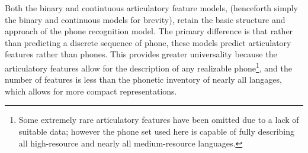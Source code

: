 Both the binary and contintuous articulatory feature models, (henceforth
simply the binary and continuous models for brevity), retain the basic 
structure and approach of the phone recognition model. The primary difference
is that rather than predicting a discrete sequence of phone, these models 
predict articulatory features rather than phones. This provides greater 
universality because the articulatory features allow for the description
of any realizable phone\footnote{Some extremely rare articulatory features 
have been omitted due to a lack of suitable data; however the phone set used here is capable 
of fully describing all high-resource and nearly all medium-resource languages.}, 
and the number of features is less than the phonetic inventory of nearly 
all langages, which allows for more compact representations.

